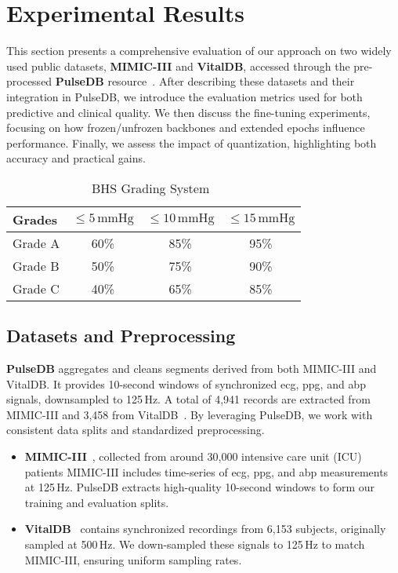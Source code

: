 \section{Experimental Results}\label{sec:results}
This section presents a comprehensive evaluation of our approach on two widely used public datasets, \textbf{MIMIC-III} and \textbf{VitalDB}, accessed through the pre-processed \textbf{PulseDB} resource~\cite{pulsedb}. After describing these datasets and their integration in PulseDB, we introduce the evaluation metrics used for both predictive and clinical quality. We then discuss the fine-tuning experiments, focusing on how frozen/unfrozen backbones and extended epochs influence performance. Finally, we assess the impact of quantization, highlighting both accuracy and practical gains.

\begin{table}[b]
\vspace{-0.5cm}
    \footnotesize
    \centering
    \caption{BHS Grading System~\cite{BHS}}\label{tab:req}
    \begin{tabular}{l c c c} 
        \toprule
        Grades & $\leq 5 \, \text{mmHg}$ & $\leq 10 \, \text{mmHg}$ & $\leq 15 \, \text{mmHg}$ \\
        \midrule
        Grade A & 60\% & 85\% & 95\% \\
        Grade B & 50\% & 75\% & 90\% \\
        Grade C & 40\% & 65\% & 85\% \\ 
        \bottomrule
    \end{tabular}
\end{table}

\subsection{Datasets and Preprocessing}\label{sec:datasets}
\textbf{PulseDB} aggregates and cleans segments derived from both MIMIC-III and VitalDB. It provides 10-second windows of synchronized \gls{ecg}, \gls{ppg}, and \gls{abp} signals, downsampled to 125\,Hz. A total of 4,941 records are extracted from MIMIC-III and 3,458 from VitalDB~\cite{pulsedb}. By leveraging PulseDB, we work with consistent data splits and standardized preprocessing.

\begin{itemize}
    \item \textbf{MIMIC-III}~\cite{mimiciii}, collected from around 30,000 intensive care unit (ICU) patients MIMIC-III includes time-series of \gls{ecg}, \gls{ppg}, and \gls{abp} measurements at 125\,Hz. PulseDB extracts high-quality 10-second windows to form our training and evaluation splits.
    \item \textbf{VitalDB}~\cite{vitaldb} contains synchronized recordings from 6,153 subjects, originally sampled at 500\,Hz. We down-sampled these signals to 125\,Hz to match MIMIC-III, ensuring uniform sampling rates. 
\end{itemize}

